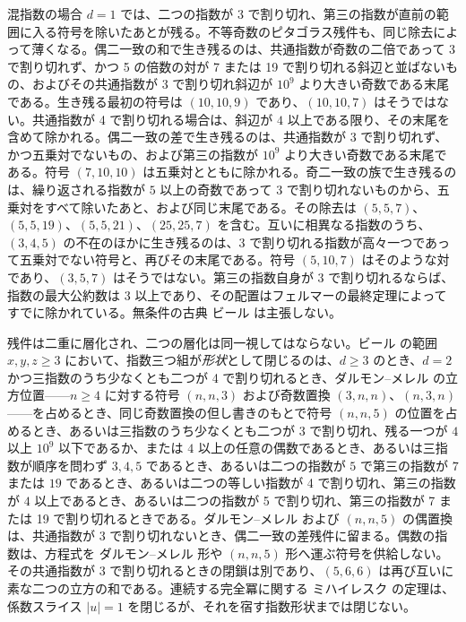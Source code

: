 \documentclass[a4paper]{article}
\theoremstyle{definition}
\theoremstyle{remark}
\begin{document}
混指数の場合 \( d=1 \) では、二つの指数が 3 で割り切れ、第三の指数が直前の範囲に入る符号を除いたあとが残る。不等奇数のピタゴラス残件も、同じ除去によって薄くなる。偶二一致の和で生き残るのは、共通指数が奇数の二倍であって 3 で割り切れず、かつ 5 の倍数の対が 7 または 19 で割り切れる斜辺と並ばないもの、およびその共通指数が 3 で割り切れ斜辺が \( 10^9 \) より大きい奇数である末尾である。生き残る最初の符号は \( (10,10,9) \) であり、\( (10,10,7) \) はそうではない。共通指数が 4 で割り切れる場合は、斜辺が \( 4 \) 以上である限り、その末尾を含めて除かれる。偶二一致の差で生き残るのは、共通指数が 3 で割り切れず、かつ五乗対でないもの、および第三の指数が \( 10^9 \) より大きい奇数である末尾である。符号 \( (7,10,10) \) は五乗対とともに除かれる。奇二一致の族で生き残るのは、繰り返される指数が \( 5 \) 以上の奇数であって 3 で割り切れないものから、五乗対をすべて除いたあと、および同じ末尾である。その除去は \( (5,5,7) \)、\( (5,5,19) \)、\( (5,5,21) \)、\( (25,25,7) \) を含む。互いに相異なる指数のうち、\( (3,4,5) \) の不在のほかに生き残るのは、3 で割り切れる指数が高々一つであって五乗対でない符号と、再びその末尾である。符号 \( (5,10,7) \) はそのような対であり、\( (3,5,7) \) はそうではない。第三の指数自身が 3 で割り切れるならば、指数の最大公約数は 3 以上であり、その配置はフェルマーの最終定理によってすでに除かれている。無条件の古典 ビール は主張しない。

残件は二重に層化され、二つの層化は同一視してはならない。ビール の範囲 \( x,y,z\ge 3 \) において、指数三つ組が\emph{形状}として閉じるのは、\( d\ge 3 \) のとき、\( d=2 \) かつ三指数のうち少なくとも二つが 4 で割り切れるとき、ダルモン--メレル の立方位置——\( n\ge 4 \) に対する符号 \( (n,n,3) \) および奇数置換 \( (3,n,n) \)、\( (n,3,n) \)——を占めるとき、同じ奇数置換の但し書きのもとで符号 \( (n,n,5) \) の位置を占めるとき、あるいは三指数のうち少なくとも二つが 3 で割り切れ、残る一つが \( 4 \) 以上 \( 10^9 \) 以下であるか、または \( 4 \) 以上の任意の偶数であるとき、あるいは三指数が順序を問わず \( 3,4,5 \) であるとき、あるいは二つの指数が \( 5 \) で第三の指数が \( 7 \) または \( 19 \) であるとき、あるいは二つの等しい指数が 4 で割り切れ、第三の指数が \( 4 \) 以上であるとき、あるいは二つの指数が 5 で割り切れ、第三の指数が 7 または 19 で割り切れるときである。ダルモン--メレル および \( (n,n,5) \) の偶置換は、共通指数が 3 で割り切れないとき、偶二一致の差残件に留まる。偶数の指数は、方程式を ダルモン--メレル 形や \( (n,n,5) \) 形へ運ぶ符号を供給しない。その共通指数が 3 で割り切れるときの閉鎖は別であり、\( (5,6,6) \) は再び互いに素な二つの立方の和である。連続する完全冪に関する ミハイレスク の定理は、係数スライス \( |u|=1 \) を閉じるが、それを宿す指数形状までは閉じない。
\end{document}
